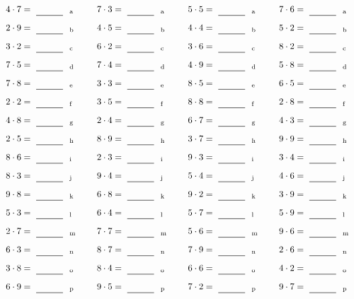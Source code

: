 \documentclass
[
  draft    = true,
  fontsize = 11pt,
  parskip  = half-
]
{scrartcl}
\begin{document}
\par\vfill\par
\begin{align*}
    \pline{4\cdot7}&=\rline{a}
  & \pline{7\cdot3}&=\rline{a}
  & \pline{5\cdot5}&=\rline{a}
  & \pline{7\cdot6}&=\rline{a} \\[1ex]
    \pline{2\cdot9}&=\rline{b}
  & \pline{4\cdot5}&=\rline{b}
  & \pline{4\cdot4}&=\rline{b}
  & \pline{5\cdot2}&=\rline{b} \\[1ex]
    \pline{3\cdot2}&=\rline{c}
  & \pline{6\cdot2}&=\rline{c}
  & \pline{3\cdot6}&=\rline{c}
  & \pline{8\cdot2}&=\rline{c} \\[1ex]
    \pline{7\cdot5}&=\rline{d}
  & \pline{7\cdot4}&=\rline{d}
  & \pline{4\cdot9}&=\rline{d}
  & \pline{5\cdot8}&=\rline{d} \\[1ex]
    \pline{7\cdot8}&=\rline{e}
  & \pline{3\cdot3}&=\rline{e}
  & \pline{8\cdot5}&=\rline{e}
  & \pline{6\cdot5}&=\rline{e} \\[1ex]
    \pline{2\cdot2}&=\rline{f}
  & \pline{3\cdot5}&=\rline{f}
  & \pline{8\cdot8}&=\rline{f}
  & \pline{2\cdot8}&=\rline{f} \\[1ex]
    \pline{4\cdot8}&=\rline{g}
  & \pline{2\cdot4}&=\rline{g}
  & \pline{6\cdot7}&=\rline{g}
  & \pline{4\cdot3}&=\rline{g} \\[1ex]
    \pline{2\cdot5}&=\rline{h}
  & \pline{8\cdot9}&=\rline{h}
  & \pline{3\cdot7}&=\rline{h}
  & \pline{9\cdot9}&=\rline{h} \\[1ex]
    \pline{8\cdot6}&=\rline{i}
  & \pline{2\cdot3}&=\rline{i}
  & \pline{9\cdot3}&=\rline{i}
  & \pline{3\cdot4}&=\rline{i} \\[1ex]
    \pline{8\cdot3}&=\rline{j}
  & \pline{9\cdot4}&=\rline{j}
  & \pline{5\cdot4}&=\rline{j}
  & \pline{4\cdot6}&=\rline{j} \\[1ex]
    \pline{9\cdot8}&=\rline{k}
  & \pline{6\cdot8}&=\rline{k}
  & \pline{9\cdot2}&=\rline{k}
  & \pline{3\cdot9}&=\rline{k} \\[1ex]
    \pline{5\cdot3}&=\rline{l}
  & \pline{6\cdot4}&=\rline{l}
  & \pline{5\cdot7}&=\rline{l}
  & \pline{5\cdot9}&=\rline{l} \\[1ex]
    \pline{2\cdot7}&=\rline{m}
  & \pline{7\cdot7}&=\rline{m}
  & \pline{5\cdot6}&=\rline{m}
  & \pline{9\cdot6}&=\rline{m} \\[1ex]
    \pline{6\cdot3}&=\rline{n}
  & \pline{8\cdot7}&=\rline{n}
  & \pline{7\cdot9}&=\rline{n}
  & \pline{2\cdot6}&=\rline{n} \\[1ex]
    \pline{3\cdot8}&=\rline{o}
  & \pline{8\cdot4}&=\rline{o}
  & \pline{6\cdot6}&=\rline{o}
  & \pline{4\cdot2}&=\rline{o} \\[1ex]
    \pline{6\cdot9}&=\rline{p}
  & \pline{9\cdot5}&=\rline{p}
  & \pline{7\cdot2}&=\rline{p}
  & \pline{9\cdot7}&=\rline{p}
\end{align*}
\end{document}
